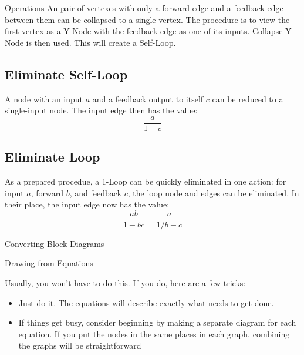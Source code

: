 \documentclass{../templates/topic}
\begin{document}
\begin{section}{Operations}
		An pair of vertexes with only a forward edge and a feedback edge between them can be collapsed to a single vertex. The procedure is to view the first vertex as a Y Node with the feedback edge as one of its inputs. Collapse Y Node is then used. This will create a Self-Loop.
	
	\subsection{Eliminate Self-Loop}
		
		A node with an input $a$ and a feedback output to itself $c$ can be reduced to a single-input node. The input edge then has the value:
		\begin{equation*}
			\frac{a}{1-c}
		\end{equation*}
	
	\subsection{Eliminate Loop}
	
		As a prepared procedue, a 1-Loop can be quickly eliminated in one action: for input $a$, forward $b$, and feedback $c$, the loop node and edges can be eliminated. In their place, the input edge now has the value:
		\begin{equation*}
			\frac{ab}{1-bc}=\frac{a}{1/b-c}
		\end{equation*}
	
\end{section}

\begin{section}{Converting Block Diagrams}
\end{section}

\begin{section}{Drawing from Equations}
	
	Usually, you won't have to do this. If you do, here are a few tricks:
	
	\begin{itemize}
		\item Just do it. The equations will describe exactly what needs to get done.
		\item If things get busy, consider beginning by making a separate diagram for each equation. If you put the nodes in the same places in each graph, combining the graphs will be straightforward
	\end{itemize}
	
\end{section}
\end{document}
